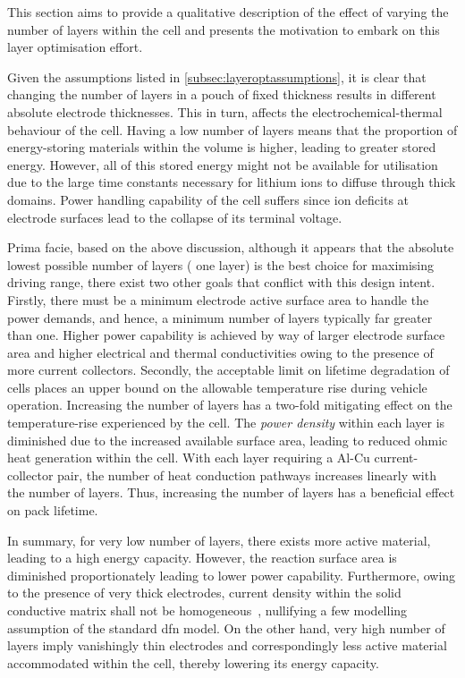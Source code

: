 This section aims to provide a  qualitative description of the effect of varying
the number of  layers within the cell  and presents the motivation  to embark on
this layer optimisation effort.

Given the  assumptions listed in \cref{subsec:layeroptassumptions},  it is clear
that  changing the  number  of layers  in  a pouch  of  fixed thickness  results
in  different  absolute  electrode  thicknesses.   This  in  turn,  affects  the
electrochemical-thermal behaviour  of the  cell. Having a  low number  of layers
means  that the  proportion of  energy-storing  materials within  the volume  is
higher, leading  to greater stored  energy. However,  all of this  stored energy
might not be available for utilisation due to the large time constants necessary
for lithium ions to diffuse through  thick domains. Power handling capability of
the cell suffers  since ion deficits at electrode surfaces  lead to the collapse
of its terminal voltage.

Prima  facie, based  on  the  above discussion,  although  it  appears that  the
absolute lowest possible  number of layers (\ie{} one layer)  is the best choice
for maximising  driving range, there  exist two  other goals that  conflict with
this design  intent. Firstly, there must  be a minimum electrode  active surface
area  to  handle the  power  demands,  and hence,  a  minimum  number of  layers
typically far  greater than one. Higher  power capability is achieved  by way of
larger electrode surface  area and higher electrical  and thermal conductivities
owing to the presence of more current collectors. Secondly, the acceptable limit
on  lifetime  degradation of  cells  places  an  upper  bound on  the  allowable
temperature rise during vehicle operation. Increasing the number of layers has a
two-fold mitigating effect on the  temperature-rise experienced by the cell. The
\emph{power  density} within  each  layer  is diminished  due  to the  increased
available  surface area,  leading to  reduced ohmic  heat generation  within the
cell. With  each layer requiring a  Al-Cu current-collector pair, the  number of
heat conduction  pathways increases  linearly with the  number of  layers. Thus,
increasing the number of layers has a beneficial effect on pack lifetime.

In summary,  for very low number  of layers, there exists  more active material,
leading  to a  high  energy  capacity. However,  the  reaction  surface area  is
diminished proportionately leading to lower power capability. Furthermore, owing
to  the presence  of very  thick electrodes,  current density  within the  solid
conductive  matrix shall  not be  homogeneous~\cite{Pals1995}, nullifying  a few
modelling assumption  of the standard \gls{dfn}  model. On the other  hand, very
high number of layers imply vanishingly thin electrodes and correspondingly less
active  material  accommodated within  the  cell,  thereby lowering  its  energy
capacity.

